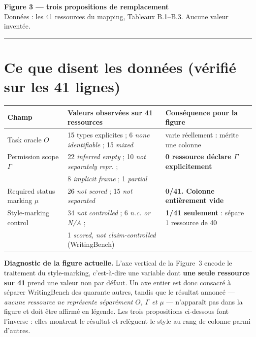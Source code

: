 \documentclass[10pt]{article}
\begin{document}
\pagestyle{empty}

\begin{center}
{\Large\bfseries Figure 3 --- trois propositions de remplacement}\\[2pt]
{\small Donn\'ees : les 41 ressources du mapping, Tableaux B.1--B.3. Aucune valeur invent\'ee.}
\end{center}

\vspace{4pt}
\noindent\rule{\linewidth}{0.4pt}

\section*{Ce que disent les donn\'ees (v\'erifi\'e sur les 41 lignes)}
\noindent
\begin{tabular}{@{}lll@{}}
\toprule
\textbf{Champ} & \textbf{Valeurs observ\'ees sur 41 ressources} & \textbf{Cons\'equence pour la figure}\\
\midrule
Task oracle $O$ & 15 types explicites ; 6 \emph{none identifiable} ; 15 \emph{mixed} & varie r\'eellement : m\'erite une colonne\\
Permission scope $\Gamma$ & 22 \emph{inferred empty} ; 10 \emph{not separately repr.} ; & \textbf{0 ressource d\'eclare $\Gamma$ explicitement}\\
                          & 8 \emph{implicit frame} ; 1 \emph{partial} & \\
Required status marking $\mu$ & 26 \emph{not scored} ; 15 \emph{not separated} & \textbf{0/41. Colonne enti\`erement vide}\\
Style-marking control & 34 \emph{not controlled} ; 6 \emph{n.c. or N/A} ; & \textbf{1/41 seulement} : s\'epare 1 ressource de 40\\
                      & 1 \emph{scored, not claim-controlled} (WritingBench) & \\
\bottomrule
\end{tabular}

\vspace{6pt}
\noindent\textbf{Diagnostic de la figure actuelle.} L'axe vertical de la Figure~3 encode le traitement du
style-marking, c'est-\`a-dire une variable dont \textbf{une seule ressource sur 41} prend une valeur non
par d\'efaut. Un axe entier est donc consacr\'e \`a s\'eparer WritingBench des quarante autres, tandis que le
r\'esultat annonc\'e --- \emph{aucune ressource ne repr\'esente s\'epar\'ement $O$, $\Gamma$ et $\mu$} --- n'appara\^it
pas dans la figure et doit \^etre affirm\'e en l\'egende. Les trois propositions ci-dessous font l'inverse :
elles montrent le r\'esultat et rel\`eguent le style au rang de colonne parmi d'autres.
\end{document}

